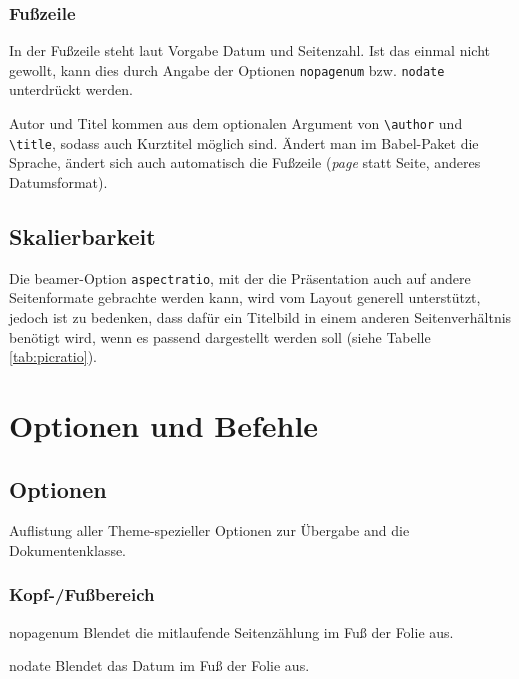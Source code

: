 \documentclass[cmyk,a4paper,colorscheme=green,TUBStitlepage=picture]{tubsreprt}
\begin{document}
\subsection{Fußzeile}

In der Fußzeile steht laut Vorgabe Datum und Seitenzahl.
Ist das einmal nicht gewollt, kann dies durch Angabe der Optionen
\lstinline{nopagenum} bzw. \lstinline{nodate} unterdrückt werden.

Autor und Titel kommen aus dem optionalen Argument von \lstinline{\author}
und \lstinline{\title}, sodass auch Kurztitel möglich sind.
Ändert man im Babel-Paket die Sprache, ändert sich auch automatisch
die Fußzeile (\textit{page} statt Seite, anderes Datumsformat).


\section{Skalierbarkeit}

Die beamer-Option \lstinline{aspectratio}, mit der die Präsentation auch auf
andere Seitenformate gebrachte werden kann, wird vom Layout generell
unterstützt, jedoch ist zu bedenken, dass dafür ein Titelbild in einem anderen
Seitenverhältnis benötigt wird, wenn es passend dargestellt werden soll
(siehe Tabelle \ref{tab:picratio}).


\chapter{Optionen und Befehle}

\section{Optionen}

Auflistung aller Theme-spezieller Optionen zur Übergabe and die
Dokumentenklasse.

\subsection{Kopf-/Fußbereich}

\begin{classoption}{nopagenum}
  Blendet die mitlaufende Seitenzählung im Fuß der Folie aus.
\end{classoption}

\begin{classoption}{nodate}
  Blendet das Datum im Fuß der Folie aus.
\end{classoption}
\end{document}

